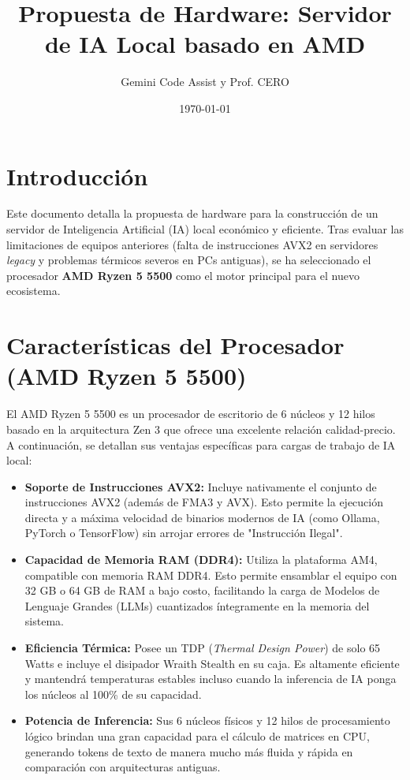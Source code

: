 \documentclass[12pt,a4paper]{article}
\title{Propuesta de Hardware: Servidor de IA Local basado en AMD}
\author{Gemini Code Assist y Prof. CERO}
\date{\today}
\begin{document}
\maketitle

\section{Introducción}
Este documento detalla la propuesta de hardware para la construcción de un servidor de Inteligencia Artificial (IA) local económico y eficiente. Tras evaluar las limitaciones de equipos anteriores (falta de instrucciones AVX2 en servidores \textit{legacy} y problemas térmicos severos en PCs antiguas), se ha seleccionado el procesador \textbf{AMD Ryzen 5 5500} como el motor principal para el nuevo ecosistema.

\section{Características del Procesador (AMD Ryzen 5 5500)}
El AMD Ryzen 5 5500 es un procesador de escritorio de 6 núcleos y 12 hilos basado en la arquitectura Zen 3 que ofrece una excelente relación calidad-precio. A continuación, se detallan sus ventajas específicas para cargas de trabajo de IA local:

\begin{itemize}
    \item \textbf{Soporte de Instrucciones AVX2:} Incluye nativamente el conjunto de instrucciones AVX2 (además de FMA3 y AVX). Esto permite la ejecución directa y a máxima velocidad de binarios modernos de IA (como Ollama, PyTorch o TensorFlow) sin arrojar errores de "Instrucción Ilegal".
    \item \textbf{Capacidad de Memoria RAM (DDR4):} Utiliza la plataforma AM4, compatible con memoria RAM DDR4. Esto permite ensamblar el equipo con 32 GB o 64 GB de RAM a bajo costo, facilitando la carga de Modelos de Lenguaje Grandes (LLMs) cuantizados íntegramente en la memoria del sistema.
    \item \textbf{Eficiencia Térmica:} Posee un TDP (\textit{Thermal Design Power}) de solo 65 Watts e incluye el disipador Wraith Stealth en su caja. Es altamente eficiente y mantendrá temperaturas estables incluso cuando la inferencia de IA ponga los núcleos al 100\% de su capacidad.
    \item \textbf{Potencia de Inferencia:} Sus 6 núcleos físicos y 12 hilos de procesamiento lógico brindan una gran capacidad para el cálculo de matrices en CPU, generando tokens de texto de manera mucho más fluida y rápida en comparación con arquitecturas antiguas.
\end{itemize}
\end{document}
